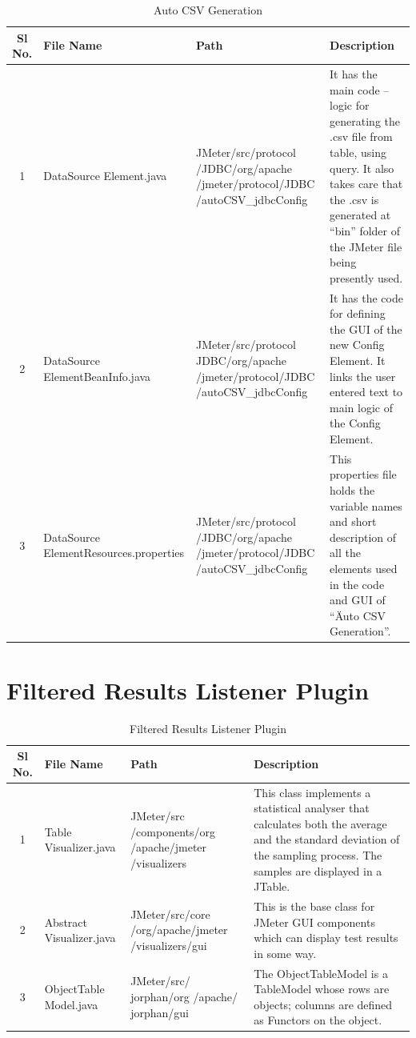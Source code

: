 \documentclass[12pt]{book}
\begin{document}
  
 \begin{table}[H]
  \begin{center}
   \begin{tabular}{|c|p{3cm}|p{4cm}|p{6cm}|} 
   \hline
   \textbf{Sl No.} & \textbf{File Name} & \textbf{Path} & \textbf{Description}\\
   \hline
   1 & DataSource Element.java & JMeter/src/protocol /JDBC/org/apache /jmeter/protocol/JDBC /autoCSV\_jdbcConfig & It has the main code – logic for generating the .csv file
                        from table, using query. It also takes care that the .csv is generated at ``bin'' folder of the JMeter file being presently used.\\
   \hline
   2 & DataSource ElementBeanInfo.java & JMeter/src/protocol JDBC/org/apache /jmeter/protocol/JDBC /autoCSV\_jdbcConfig & It has the code for defining
the GUI of the new Config
Element. It links the user
entered text to main logic of
the Config Element.\\
   \hline
   3 & DataSource ElementResources.properties & JMeter/src/protocol /JDBC/org/apache /jmeter/protocol/JDBC /autoCSV\_jdbcConfig & This properties file holds the variable names and short description of all the elements used in the code and GUI of “Äuto CSV Generation”.\\
   \hline
   \end{tabular}
   \caption{Auto CSV Generation}
  \end{center}
 \end{table}
  
  \section{Filtered Results Listener Plugin}
 \begin{table}[H]
  \begin{center}
   \begin{tabular}{|c|p{3cm}|p{4cm}|p{6cm}|} 
   \hline
   \textbf{Sl No.} & \textbf{File Name} & \textbf{Path} & \textbf{Description}\\
   \hline
   1 & Table Visualizer.java & JMeter/src /components/org /apache/jmeter /visualizers & This class implements a statistical analyser that calculates both the average and the standard deviation of the sampling process. The samples are displayed in a JTable.\\
   \hline
   2 & Abstract Visualizer.java & JMeter/src/core /org/apache/jmeter /visualizers/gui & This is the base class for JMeter GUI components which can display test results in some way.\\
   \hline
   3 & ObjectTable Model.java & JMeter/src/ jorphan/org /apache/ jorphan/gui & The ObjectTableModel is a TableModel whose rows are objects; columns are defined as Functors on the object.\\
   \hline
      \end{tabular}
   \caption{Filtered Results Listener Plugin}
  \end{center}
 \end{table}
 
\end{document}

